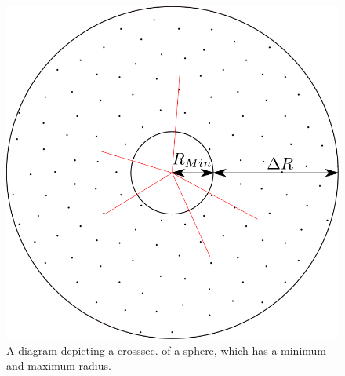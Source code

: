 \documentclass[12pt,a4paper]{article}
\begin{document}
\begin{figure}[h!]
\centering
\includegraphics[scale=0.2]{Images//Materials//RMAX.png}
\caption[width=\columnwidth]{A diagram depicting a crosssec. of a sphere, which has a minimum and maximum radius.}
\label{deltar}
\end{figure}

\newpage
\end{document}
